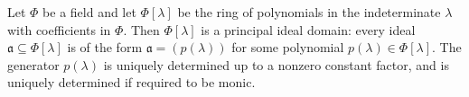 Let $\Phi$ be a field and let $\Phi[\lambda]$ be the ring of polynomials in the indeterminate $\lambda$ with coefficients in $\Phi$. Then $\Phi[\lambda]$ is a principal ideal domain: every ideal $\mathfrak{a} \subseteq \Phi[\lambda]$ is of the form $\mathfrak{a} = (p(\lambda))$ for some polynomial $p(\lambda) \in \Phi[\lambda]$. The generator $p(\lambda)$ is uniquely determined up to a nonzero constant factor, and is uniquely determined if required to be monic.
